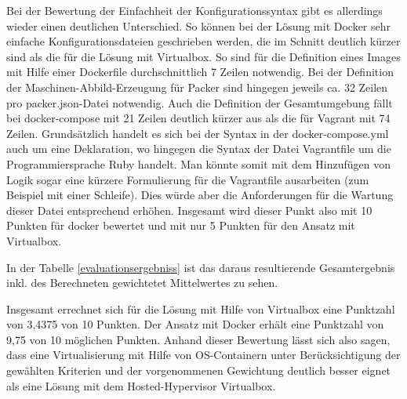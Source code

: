 Bei der Bewertung der Einfachheit der Konfigurationssyntax gibt es allerdings wieder einen deutlichen Unterschied. So können bei der Lösung mit Docker sehr einfache Konfigurationsdateien geschrieben werden, die im Schnitt deutlich kürzer sind als die für die Lösung mit Virtualbox. So sind für die Definition eines Images mit Hilfe einer Dockerfile durchschnittlich 7 Zeilen notwendig. Bei der Definition der Maschinen-Abbild-Erzeugung für Packer sind hingegen jeweils ca. 32 Zeilen pro packer.json-Datei notwendig. Auch die Definition der Gesamtumgebung fällt bei docker-compose mit 21 Zeilen deutlich kürzer aus als die für Vagrant mit 74 Zeilen. Grundsätzlich handelt es sich bei der Syntax in der docker-compose.yml auch um eine Deklaration, wo hingegen die Syntax der Datei Vagrantfile um die Programmiersprache Ruby handelt. Man könnte somit mit dem Hinzufügen von Logik sogar eine kürzere Formulierung für die Vagrantfile ausarbeiten (zum Beispiel mit einer Schleife). Dies würde aber die Anforderungen für die Wartung dieser Datei entsprechend erhöhen. Insgesamt wird dieser Punkt also mit 10 Punkten für docker bewertet und mit nur 5 Punkten für den Ansatz mit Virtualbox.

In der Tabelle \ref{evaluationsergebniss} ist das daraus resultierende Gesamtergebnis inkl. des Berechneten gewichtetet Mittelwertes zu sehen.

Insgesamt errechnet sich für die Lösung mit Hilfe von Virtualbox eine Punktzahl von 3,4375 von 10 Punkten. Der Ansatz mit Docker erhält eine Punktzahl von 9,75 von 10 möglichen Punkten. Anhand dieser Bewertung lässt sich also sagen, dass eine Virtualisierung mit Hilfe von OS-Containern unter Berücksichtigung der gewählten Kriterien und der vorgenommenen Gewichtung deutlich besser eignet als eine Lösung mit dem Hosted-Hypervisor Virtualbox.

